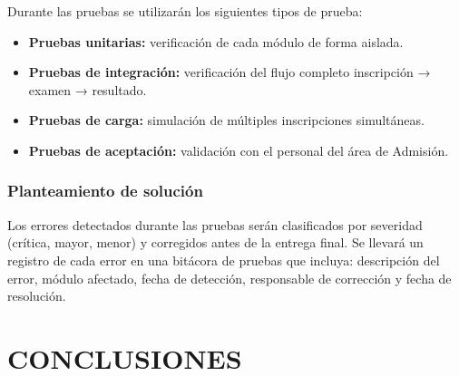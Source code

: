 \documentclass[12pt, a4paper]{report}
\begin{document}
Durante las pruebas se utilizarán los siguientes tipos de prueba:

\begin{itemize}[noitemsep]
  \item \textbf{Pruebas unitarias:} verificación de cada módulo de forma aislada.
  \item \textbf{Pruebas de integración:} verificación del flujo completo inscripción → examen → resultado.
  \item \textbf{Pruebas de carga:} simulación de múltiples inscripciones simultáneas.
  \item \textbf{Pruebas de aceptación:} validación con el personal del área de Admisión.
\end{itemize}

\subsection{Planteamiento de solución}

Los errores detectados durante las pruebas serán clasificados por severidad (crítica, mayor, menor) y corregidos antes de la entrega final. Se llevará un registro de cada error en una bitácora de pruebas que incluya: descripción del error, módulo afectado, fecha de detección, responsable de corrección y fecha de resolución.


\chapter*{CONCLUSIONES}
\end{document}
